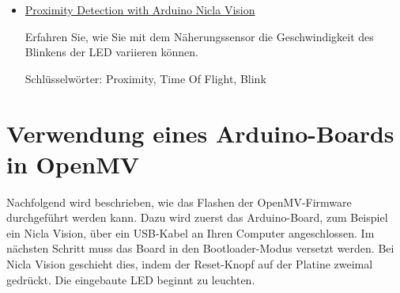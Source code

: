 \begin{itemize}
	Erfahren Sie, wie Sie auf die Daten des Beschleunigungsmessers und des Gyroskops zugreifen können, die im Lieferumfang des LSM6DSOXTR IMU-Moduls enthalten sind.
	
	\medskip
	
	Schlüsselwörter:  Gyroscope, Accelerometer
	
	\medskip
	
	\item \href{https://docs.arduino.cc/tutorials/nicla-vision/proximity}{Proximity Detection with Arduino Nicla Vision}
	
	Erfahren Sie, wie Sie mit dem Näherungssensor die Geschwindigkeit des Blinkens der LED variieren können.
	
	\medskip	
	
	Schlüsselwörter: Proximity, Time Of Flight, Blink  
	
\end{itemize}







\section{Verwendung eines Arduino-Boards in OpenMV}

Nachfolgend wird beschrieben, wie das Flashen der OpenMV-Firmware durchgeführt werden kann. Dazu wird zuerst das Arduino-Board, zum Beispiel ein Nicla Vision, über ein USB-Kabel an Ihren Computer angeschlossen. Im nächsten Schritt muss das Board in den Bootloader-Modus versetzt werden. Bei Nicla Vision geschieht dies, indem der Reset-Knopf auf der Platine zweimal gedrückt. Die eingebaute LED beginnt zu leuchten. 

%	


%	



